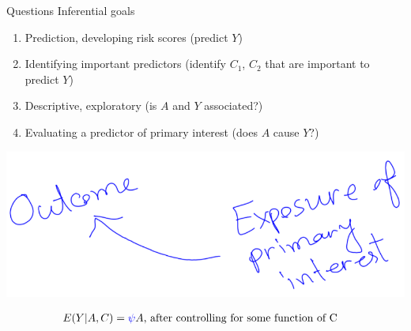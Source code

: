 \documentclass[
  ignorenonframetext,
  aspectratio=169]{beamer}
\providecommand{\tightlist}{%
  \setlength{\itemsep}{0pt}\setlength{\parskip}{0pt}}
\begin{document}
\begin{frame}{Questions}
\protect\hypertarget{questions}{}
Inferential goals

\begin{enumerate}
\tightlist
\item
  Prediction, developing risk scores (predict \(Y\))
\item
  Identifying important predictors (identify \(C_1\), \(C_2\) that are
  important to predict \(Y\))
\item
  Descriptive, exploratory (is \(A\) and \(Y\) associated?)
\item
  Evaluating a predictor of primary interest (does \(A\) cause \(Y\)?)
\end{enumerate}

\begin{center}
\includegraphics[width=0.7\linewidth]{p1.png} 
\end{center}

\begin{equation}
\begin{aligned}
E(Y|A,C) &= \textcolor{blue}{\psi} A \text{, after controlling for some function of C} \nonumber
\end{aligned}
\end{equation}
\end{frame}
\end{document}
